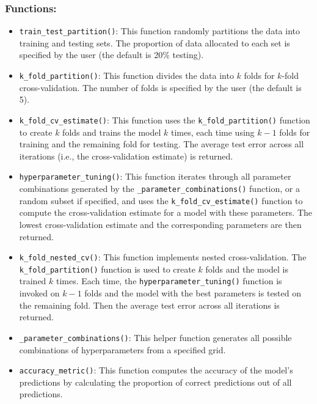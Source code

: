 \documentclass{article}
\begin{document}
\subsubsection*{Functions:}

\begin{itemize}
    \item \texttt{train\_test\_partition()}: 
    This function randomly partitions the data into training and testing sets. The proportion of data allocated to each set is specified by the user (the default is 20\% testing).
    
    \item \texttt{k\_fold\_partition()}:  
    This function divides the data into \( k \) folds for \( k \)-fold cross-validation. The number of folds is specified by the user (the default is 5).
    
    \item \texttt{k\_fold\_cv\_estimate()}:  
    This function uses the \texttt{k\_fold\_partition()} function to create \( k \) folds and trains the model \( k \) times, each time using \( k-1 \) folds for training and the remaining fold for testing. The average test error across all iterations (i.e., the cross-validation estimate) is returned.
    
    \item \texttt{hyperparameter\_tuning()}: 
        This function iterates through all parameter combinations generated by the \texttt{\_parameter\_combinations()} function, or a random subset if specified, and uses the \texttt{k\_fold\_cv\_estimate()} function to compute the cross-validation estimate for a model with these parameters. The lowest cross-validation estimate and the corresponding parameters are then returned.
        
    \item \texttt{k\_fold\_nested\_cv()}: 
    This function implements nested cross-validation. The \texttt{k\_fold\_partition()} function is used to create \( k \) folds and the model is trained \( k \) times. Each time, the \texttt{hyperparameter\_tuning()} function is invoked on \( k-1 \) folds and the model with the best parameters is tested on the remaining fold. Then the average test error across all iterations is returned.

    \item \texttt{\_parameter\_combinations()}: 
    This helper function generates all possible combinations of hyperparameters from a specified grid.

\item \texttt{accuracy\_metric()}: 
    This function computes the accuracy of the model’s predictions by calculating the proportion of correct predictions out of all predictions.


\end{itemize}
\end{document}
